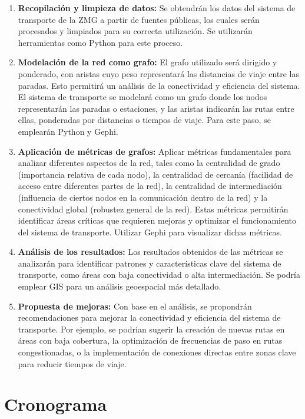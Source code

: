 \documentclass[12pt,oneside]{article}
\begin{document}
\begin{enumerate}
\item \textbf{Recopilación y limpieza de datos:} Se obtendrán los datos del sistema de transporte de la ZMG a partir de fuentes públicas, los cuales serán procesados y limpiados para su correcta utilización. Se utilizarán herramientas como Python para este proceso.

\item \textbf{Modelación de la red como grafo:} El grafo utilizado será dirigido y ponderado, con aristas cuyo peso representará las distancias de viaje entre las paradas. Esto permitirá un análisis de la conectividad y eficiencia del sistema. El sistema de transporte se modelará como un grafo donde los nodos representarán las paradas o estaciones, y las aristas indicarán las rutas entre ellas, ponderadas por distancias o tiempos de viaje. Para este paso, se emplearán Python y Gephi.

\item \textbf{Aplicación de métricas de grafos:} Aplicar métricas fundamentales para analizar diferentes aspectos de la red, tales como la centralidad de grado (importancia relativa de cada nodo), la centralidad de cercanía (facilidad de acceso entre diferentes partes de la red), la centralidad de intermediación (influencia de ciertos nodos en la comunicación dentro de la red) y la conectividad global (robustez general de la red). Estas métricas permitirán identificar áreas críticas que requieren mejoras y optimizar el funcionamiento del sistema de transporte. Utilizar Gephi para visualizar dichas métricas.

\item \textbf{Análisis de los resultados:} Los resultados obtenidos de las métricas se analizarán para identificar patrones y características clave del sistema de transporte, como áreas con baja conectividad o alta intermediación. Se podría emplear GIS para un análisis geoespacial más detallado.

\item \textbf{Propuesta de mejoras:} Con base en el análisis, se propondrán recomendaciones para mejorar la conectividad y eficiencia del sistema de transporte. Por ejemplo, se podrían sugerir la creación de nuevas rutas en áreas con baja cobertura, la optimización de frecuencias de paso en rutas congestionadas, o la implementación de conexiones directas entre zonas clave para reducir tiempos de viaje.
\end{enumerate}

\section{Cronograma}
\end{document}
